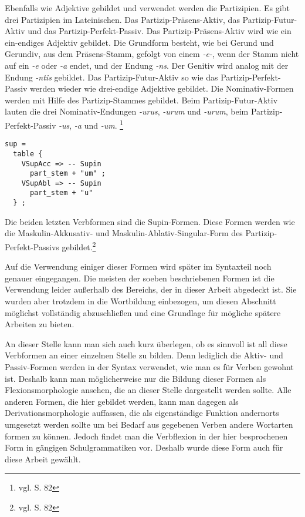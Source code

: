 Ebenfalls wie Adjektive gebildet und verwendet werden die Partizipien. Es gibt drei Partizipien im Lateinischen. Das Partizip-Präsens-Aktiv, das Partizip-Futur-Aktiv und das Partizip-Perfekt-Passiv. Das Partizip-Präsens-Aktiv wird wie ein ein-endiges Adjektiv gebildet. Die Grundform besteht, wie bei Gerund und Gerundiv, aus dem Präsens-Stamm, gefolgt von einem \textit{-e-}, wenn der Stamm nicht auf ein \textit{-e} oder \textit{-a} endet, und der Endung \textit{-ns}. Der Genitiv wird analog mit der Endung \textit{-ntis} gebildet. Das Partizip-Futur-Aktiv so wie das Partizip-Perfekt-Passiv werden wieder wie drei-endige Adjektive gebildet. Die Nominativ-Formen werden mit Hilfe des Partizip-Stammes gebildet. Beim Partizip-Futur-Aktiv lauten die drei Nominativ-Endungen \textit{-urus}, \textit{-urum} und \textit{-urum}, beim Partizip-Perfekt-Passiv \textit{-us}, \textit{-a} und \textit{-um}. \footnote{vgl. \cite{BAYER-LINDAUER1994} S. 82} \par
\begin{lstlisting}[float=h!tp,caption={Ausschnitt aus der Funktion \texttt{mkVerb} um Supin-Verbformen zu bilden (vgl. \textbf{ResLat.gf})},label={GF-Res-MkVerb-Sup},basicstyle=\small]
sup = 
  table {
    VSupAcc => -- Supin
      part_stem + "um" ;
    VSupAbl => -- Supin
      part_stem + "u" 
  } ;
\end{lstlisting}
Die beiden letzten Verbformen sind die Supin-Formen. Diese Formen werden wie die Maskulin-Akkusativ- und Maskulin-Ablativ-Singular-Form des Partizip-Perfekt-Passivs gebildet.\footnote{vgl. \cite{BAYER-LINDAUER1994} S. 82} \par
Auf die Verwendung einiger dieser Formen wird später im Syntaxteil noch genauer eingegangen. Die meisten der soeben beschriebenen Formen ist die Verwendung leider außerhalb des Bereichs, der in dieser Arbeit abgedeckt ist. Sie wurden aber trotzdem in die Wortbildung einbezogen, um diesen Abschnitt möglichst vollständig abzuschließen und eine Grundlage für mögliche spätere Arbeiten zu bieten. \par
An dieser Stelle kann man sich auch kurz überlegen, ob es sinnvoll ist all diese Verbformen an einer einzelnen Stelle zu bilden. Denn lediglich die Aktiv- und Passiv-Formen werden in der Syntax verwendet, wie man es für Verben gewohnt ist. Deshalb kann man möglicherweise nur die Bildung dieser Formen als Flexionsmorphologie ansehen, die an dieser Stelle dargestellt werden sollte. Alle anderen Formen, die hier gebildet werden, kann man dagegen als Derivationsmorphologie auffassen, die als eigenständige Funktion andernorts umgesetzt werden sollte um bei Bedarf aus gegebenen Verben andere Wortarten formen zu können. Jedoch findet man die Verbflexion in der hier besprochenen Form in gängigen Schulgrammatiken vor. Deshalb wurde diese Form auch für diese Arbeit gewählt. %
\FloatBarrier
